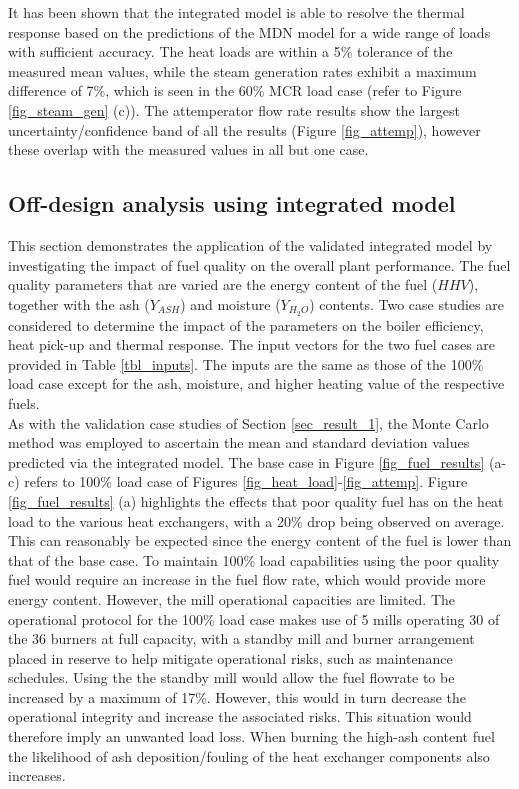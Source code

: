\documentclass[a4paper,fleqn]{cas-sc}
\begin{document}
It has been shown that the integrated model is able to resolve the thermal response based on the predictions of the MDN model for a wide range of loads with sufficient accuracy. The heat loads are within a 5\% tolerance of the measured mean values, while the steam generation rates exhibit a maximum difference of 7\%, which is seen in the 60\% MCR load case (refer to Figure \ref{fig_steam_gen} (c)). The attemperator flow rate results show the largest uncertainty/confidence band of all the results (Figure \ref{fig_attemp}), however these overlap with the measured values in all but one case. 
\subsection{Off-design analysis using integrated model}
This section demonstrates the application of the validated integrated model by investigating the impact of fuel quality on the overall plant performance. The fuel quality parameters that are varied are the energy content of the fuel ($HHV$), together with the ash ($Y_{ASH}$) and moisture ($Y_{H_{2}O}$) contents. Two case studies are considered to determine the impact of the parameters on the boiler efficiency, heat pick-up and thermal response. The input vectors for the two fuel cases are provided in Table \ref{tbl_inputs}. The inputs are the same as those of the 100\% load case except for the ash, moisture, and higher heating value of the respective fuels.\\

As with the validation case studies of Section \ref{sec_result_1}, the Monte Carlo method was employed to ascertain the mean and standard deviation values predicted via the integrated model. The base case in Figure \ref{fig_fuel_results} (a-c) refers to 100\% load case of Figures \ref{fig_heat_load}-\ref{fig_attemp}. Figure \ref{fig_fuel_results}  (a) highlights the effects that poor quality fuel has on the heat load to the various heat exchangers, with a 20\% drop being observed on average. This can reasonably be expected since the energy content of the fuel is lower than that of the base case. To maintain 100\% load capabilities using the poor quality fuel would require an increase in the fuel flow rate, which would provide more energy content. However, the mill operational capacities are limited. The operational protocol for the 100\% load case makes use of 5 mills operating 30 of the 36 burners at full capacity, with a standby mill and burner arrangement placed in reserve to help mitigate operational risks, such as maintenance schedules. Using the the standby mill would allow the fuel flowrate to be increased by a maximum of 17\%. However, this would in turn decrease the operational integrity and increase the associated risks. This situation would therefore imply an unwanted load loss. When burning the high-ash content fuel the likelihood of ash deposition/fouling of the heat exchanger components also increases.\\
\end{document}
